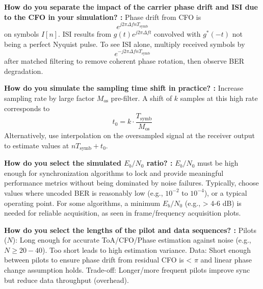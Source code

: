 \documentclass[11pt]{article}
\begin{document}
	\par\noindent\textbf{How do you separate the impact of the carrier phase drift and ISI due to the CFO in your simulation? :}\quad\ignorespaces 
		Phase drift from CFO is 
		\begin{equation} e^{j2\pi \Delta f nT_{\text{symb}}} \end{equation}
		on symbols $I[n]$. ISI results from $g(t)e^{j2\pi\Delta ft}$ convolved with $g^*(-t)$ not being a perfect Nyquist pulse. To see ISI alone, multiply received symbols by 
		\begin{equation} e^{-j2\pi \Delta f nT_{\text{symb}}} \end{equation}
		after matched filtering to remove coherent phase rotation, then observe BER degradation.
	\par
			
	\par\noindent\textbf{How do you simulate the sampling time shift in practice? :}\quad\ignorespaces 
		Increase sampling rate by large factor $M_{\text{os}}$ pre-filter. A shift of $k$ samples at this high rate corresponds to
		\begin{equation} t_0 = k \cdot \frac{T_{\text{symb}}}{M_{\text{os}}} \end{equation}
		Alternatively, use interpolation on the oversampled signal at the receiver output to estimate values at $nT_{\text{symb}} + t_0$.
	\par
			
	\par\noindent\textbf{How do you select the simulated $E_b/N_0$ ratio? :}\quad\ignorespaces 
		$E_b/N_0$ must be high enough for synchronization algorithms to lock and provide meaningful performance metrics without being dominated by noise failures. Typically, choose values where uncoded BER is reasonably low (e.g., $10^{-2}$ to $10^{-4}$), or a typical operating point. For some algorithms, a minimum $E_b/N_0$ (e.g., > 4-6 dB) is needed for reliable acquisition, as seen in frame/frequency acquisition plots.
	\par
			
	\par\noindent\textbf{How do you select the lengths of the pilot and data sequences? :}\quad\ignorespaces 
		Pilots ($N$): Long enough for accurate ToA/CFO/Phase estimation against noise (e.g., $N \ge 20-40$). Too short leads to high estimation variance.
		Data: Short enough between pilots to ensure phase drift from residual CFO is < $\pi$ and linear phase change assumption holds.
		Trade-off: Longer/more frequent pilots improve sync but reduce data throughput (overhead).
	\par
			
\end{document}
